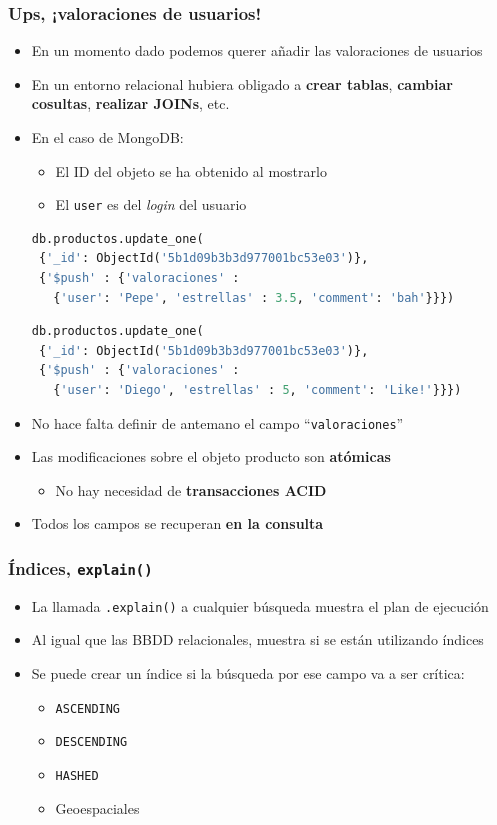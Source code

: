 \documentclass[14pt]{beamer}
\begin{document}
\begin{frame}
  \frametitle{Ups, ¡valoraciones de usuarios!}
\begin{itemize}
\item En un momento dado podemos querer añadir las valoraciones de usuarios
\item En un entorno relacional hubiera obligado a {\bf crear tablas}, {\bf
    cambiar cosultas}, {\bf realizar JOINs}, etc.
\item En el caso de MongoDB:
  \begin{itemize}
  \item El ID del objeto se ha obtenido al mostrarlo
  \item El {\tt user} es del {\em login\/} del usuario
  \end{itemize}

\begin{lstlisting}[language=python]
db.productos.update_one(
 {'_id': ObjectId('5b1d09b3b3d977001bc53e03')},
 {'$push' : {'valoraciones' :
   {'user': 'Pepe', 'estrellas' : 3.5, 'comment': 'bah'}}})
\end{lstlisting}

\framebreak

\begin{lstlisting}[language=python]
db.productos.update_one(
 {'_id': ObjectId('5b1d09b3b3d977001bc53e03')},
 {'$push' : {'valoraciones' :
   {'user': 'Diego', 'estrellas' : 5, 'comment': 'Like!'}}})
\end{lstlisting}

\item No hace falta definir de antemano el campo ``{\tt valoraciones}''
\item Las modificaciones sobre el objeto producto son {\bf atómicas}
  \begin{itemize}
  \item No hay necesidad de {\bf transacciones ACID}
  \end{itemize}
\item Todos los campos se recuperan {\bf en la consulta}
\end{itemize}
\end{frame}


\begin{frame}
  \frametitle{Índices, {\tt explain()}}
\begin{itemize}
\item La llamada {\tt .explain()} a cualquier búsqueda muestra el plan
  de ejecución
\item Al igual que las BBDD relacionales, muestra si se están utilizando
  índices
\item Se puede crear un índice si la búsqueda por ese campo va a ser
  crítica:
  \begin{itemize}
  \item {\tt ASCENDING}
  \item {\tt DESCENDING}
  \item {\tt HASHED}
  \item Geoespaciales
  \end{itemize}
\end{itemize}
\end{frame}
\end{document}
